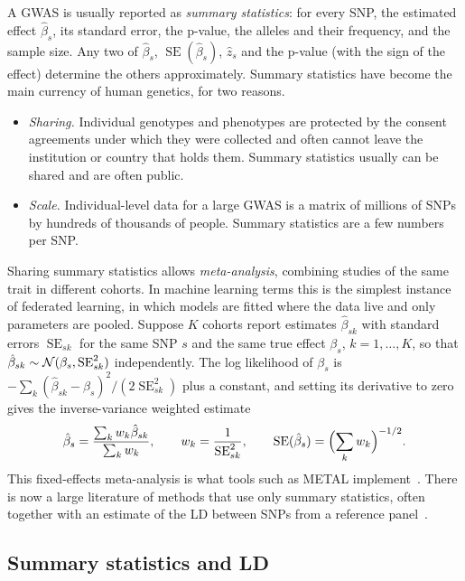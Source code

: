 A GWAS is usually reported as \emph{summary statistics}: for every SNP, the estimated effect $\hat\beta_s$, its standard error, the p-value, the alleles and their frequency, and the sample size. Any two of $\hat\beta_s$, $\operatorname{SE}(\hat\beta_s)$, $\hat z_s$ and the p-value (with the sign of the effect) determine the others approximately. Summary statistics have become the main currency of human genetics, for two reasons.
\begin{itemize}
  \item \emph{Sharing.} Individual genotypes and phenotypes are protected by the consent agreements under which they were collected and often cannot leave the institution or country that holds them. Summary statistics usually can be shared and are often public.
  \item \emph{Scale.} Individual-level data for a large GWAS is a matrix of millions of SNPs by hundreds of thousands of people. Summary statistics are a few numbers per SNP.
\end{itemize}
Sharing summary statistics allows \emph{meta-analysis}, combining studies of the same trait in different cohorts. In machine learning terms this is the simplest instance of federated learning, in which models are fitted where the data live and only parameters are pooled. Suppose $K$ cohorts report estimates $\hat\beta_{sk}$ with standard errors $\operatorname{SE}_{sk}$ for the same SNP $s$ and the same true effect $\beta_s$, $k=1,\dots,K$, so that $\hat\beta_{sk}\sim\mathcal{N}(\beta_s,\operatorname{SE}_{sk}^2)$ independently. The log likelihood of $\beta_s$ is $-\sum_k(\hat\beta_{sk}-\beta_s)^2/(2\operatorname{SE}_{sk}^2)$ plus a constant, and setting its derivative to zero gives the inverse-variance weighted estimate
\begin{equation}
  \hat\beta_s = \frac{\sum_kw_k\hat\beta_{sk}}{\sum_kw_k},\qquad w_k=\frac1{\operatorname{SE}_{sk}^2},\qquad \operatorname{SE}(\hat\beta_s)=\Bigl(\sum_kw_k\Bigr)^{-1/2}.
\end{equation}
This fixed-effects meta-analysis is what tools such as METAL implement~\citep{willer2010}. There is now a large literature of methods that use only summary statistics, often together with an estimate of the LD between SNPs from a reference panel~\citep{pasaniuc2017}.

\subsection{Summary statistics and LD}

